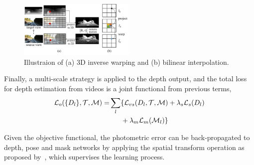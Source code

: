 \begin{figure}
\centering
\includegraphics[width=0.5\textwidth]{figures/3d_warping_comp.pdf}
\caption{Illustraion of (a) 3D inverse warping and (b) bilinear interpolation.}
\label{fig:3d_warping}
\vspace{-1\baselineskip}
\end{figure}

Finally, a multi-scale strategy is applied to the depth output, and the total loss for depth estimation from videos is a joint functional from previous terms,
\begin{align}
\label{eqn:full}
{\mathcal L}_{o}(\{D_l\}, {\mathcal T}, {\mathcal M}) =& \sum_l\{{\mathcal L}_{vs}(D_l,{\mathcal T},{\mathcal M}) + \lambda_s{\mathcal L}_{s}(D_l) \nonumber\\
&\text{~~~~~} + \lambda_m{\mathcal L}_{m}({\mathcal M}_l)\}
\end{align}

Given the objective functional, the photometric error can be back-propagated to depth, pose and mask networks by applying the spatial transform operation as proposed by~\cite{jaderberg2015spatial}, which supervises the learning process.



